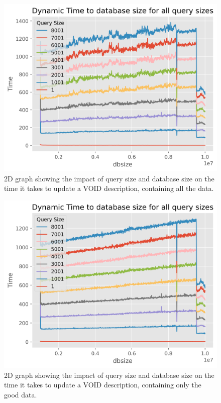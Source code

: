 \begin{figure}
    \centering
    \includegraphics[width=0.8\columnwidth]{figures/dynamic-time-query-size-all.png}
    \caption{2D graph showing the impact of query size and database size on the time it takes to update a VOID description, containing all the data.}
    \label{fig:update-querysize-all}
\end{figure}

\begin{figure}
    \centering
    \includegraphics[width=0.8\columnwidth]{figures/dynamic-time-query-size-good.png}
    \caption{2D graph showing the impact of query size and database size on the time it takes to update a VOID description, containing only the good data.}
    \label{fig:update-querysize-good}
\end{figure}


